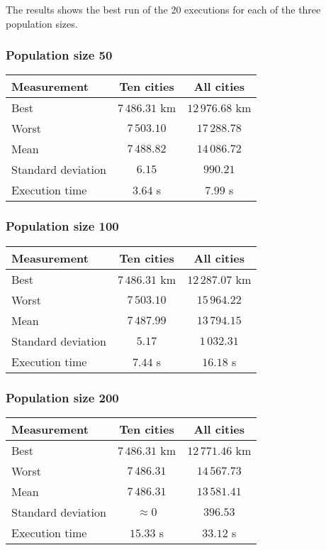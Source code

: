 \documentclass{article}
\begin{document}
The results shows the best run of the 20 executions for each of the three population sizes.

\subsubsection*{Population size 50}

\begin{center}
\begin{tabular}{lcc}
\toprule
Measurement & Ten cities & All cities \\
\midrule
Best & $7\,486.31$ km & $12\,976.68$ km \\
Worst & $7\,503.10$ & $17\,288.78$ \\
Mean & $7\,488.82$ & $14\,086.72$ \\
Standard deviation & $6.15$ & $990.21$ \\
Execution time & $3.64$ s & $7.99$ s \\
\bottomrule
\end{tabular}
\end{center}

\subsubsection*{Population size 100}

\begin{center}
\begin{tabular}{lcc}
\toprule
Measurement & Ten cities & All cities \\
\midrule
Best & $7\,486.31$ km & $12\,287.07$ km \\
Worst & $7\,503.10$ & $15\,964.22$ \\
Mean & $7\,487.99$ & $13\,794.15$ \\
Standard deviation & $5.17$ & $1\,032.31$ \\
Execution time & $7.44$ s & $16.18$ s \\
\bottomrule
\end{tabular}
\end{center}

\subsubsection*{Population size 200}

\begin{center}
\begin{tabular}{lcc}
\toprule
Measurement & Ten cities & All cities \\
\midrule
Best & $7\,486.31$ km & $12\,771.46$ km \\
Worst & $7\,486.31$ & $14\,567.73$ \\
Mean & $7\,486.31$ & $13\,581.41$ \\
Standard deviation & $\approx 0$ & $396.53$ \\
Execution time & $15.33$ s & $33.12$ s \\
\bottomrule
\end{tabular}
\end{center}
\end{document}
